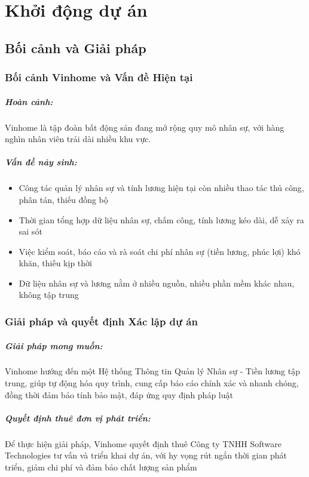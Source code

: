 \chapter{Khởi động dự án}
\label{Chapter1}
\section{Bối cảnh và Giải pháp}
\subsection{Bối cảnh Vinhome và Vấn đề Hiện tại}

\paragraph{Hoàn cảnh:}
Vinhome là tập đoàn bất động sản đang mở rộng quy mô nhân sự, với hàng nghìn nhân viên trải dài nhiều khu vực.

\paragraph{Vấn đề nảy sinh:}
\begin{itemize}
    \item Công tác quản lý nhân sự và tính lương hiện tại còn nhiều thao tác thủ công, phân tán, thiếu đồng bộ
    \item Thời gian tổng hợp dữ liệu nhân sự, chấm công, tính lương kéo dài, dễ xảy ra sai sót
    \item Việc kiểm soát, báo cáo và rà soát chi phí nhân sự (tiền lương, phúc lợi) khó khăn, thiếu kịp thời
    \item Dữ liệu nhân sự và lương nằm ở nhiều nguồn, nhiều phần mềm khác nhau, không tập trung
\end{itemize}

\subsection{Giải pháp và quyết định Xác lập dự án}
\paragraph{Giải pháp mong muốn:}
Vinhome hướng đến một Hệ thống Thông tin Quản lý Nhân sự - Tiền lương tập trung, giúp tự động hóa quy trình, cung cấp báo cáo chính xác và nhanh chóng, đồng thời đảm bảo tính bảo mật, đáp ứng quy định pháp luật
\paragraph{Quyết định thuê đơn vị phát triển:}
Để thực hiện giải pháp, Vinhome quyết định thuê Công ty TNHH Software Technologies tư vấn và triển khai dự án, với hy vọng rút ngắn thời gian phát triển, giảm chi phí và đảm bảo chất lượng sản phẩm

